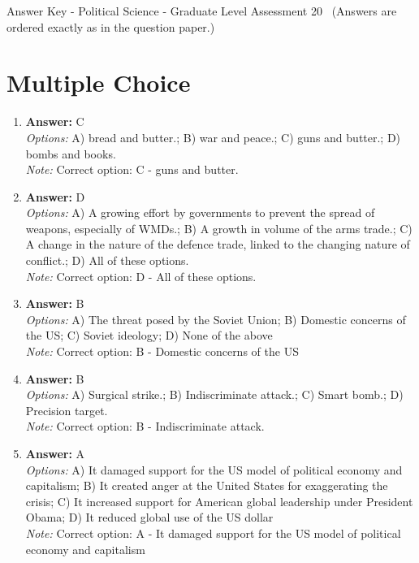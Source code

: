 \documentclass[12pt]{article}
\begin{document}
\begin{center}
Answer Key - Political Science - Graduate Level Assessment 20 \
\small (Answers are ordered exactly as in the question paper.)
\end{center}

\section*{Multiple Choice}
\begin{enumerate}[label=\arabic*.]
\item \textbf{Answer:} C
\\ \textit{Options:} A) bread and butter.; B) war and peace.; C) guns and butter.; D) bombs and books.
\\ \textit{Note:} Correct option: C - guns and butter.
\item \textbf{Answer:} D
\\ \textit{Options:} A) A growing effort by governments to prevent the spread of weapons, especially of WMDs.; B) A growth in volume of the arms trade.; C) A change in the nature of the defence trade, linked to the changing nature of conflict.; D) All of these options.
\\ \textit{Note:} Correct option: D - All of these options.
\item \textbf{Answer:} B
\\ \textit{Options:} A) The threat posed by the Soviet Union; B) Domestic concerns of the US; C) Soviet ideology; D) None of the above
\\ \textit{Note:} Correct option: B - Domestic concerns of the US
\item \textbf{Answer:} B
\\ \textit{Options:} A) Surgical strike.; B) Indiscriminate attack.; C) Smart bomb.; D) Precision target.
\\ \textit{Note:} Correct option: B - Indiscriminate attack.
\item \textbf{Answer:} A
\\ \textit{Options:} A) It damaged support for the US model of political economy and capitalism; B) It created anger at the United States for exaggerating the crisis; C) It increased support for American global leadership under President Obama; D) It reduced global use of the US dollar
\\ \textit{Note:} Correct option: A - It damaged support for the US model of political economy and capitalism
\end{enumerate}
\end{document}
